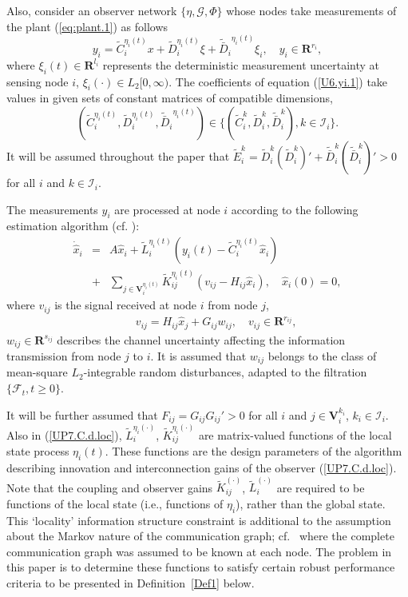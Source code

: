 \documentclass[a4paper,twocolumn]{autart}
\begin{document}
Also, consider an observer network $\{\eta,
\mathcal{G},\Phi\}$ whose nodes take measurements of the plant
(\ref{eq:plant.1}) as follows 
\begin{equation}\label{U6.yi.1}
y_i={\tilde C}_i^{\eta_i(t)}x+{\tilde D}_i^{\eta_i(t)}\xi+{\tilde{\bar
    D}_i}^{\eta_i(t)}\xi_i, \quad y_i\in\mathbf{R}^{r_i},
\end{equation}
where $\xi_i(t)\in \mathbf{R}^{l_i}$ represents the deterministic measurement 
uncertainty at sensing node $i$, $\xi_i(\cdot)\in L_2[0,\infty)$. The 
coefficients of equation (\ref{U6.yi.1}) take values in given sets of
constant matrices of compatible dimensions, 
\[
({\tilde C}_i^{\eta_i(t)},{\tilde  D}_i^{\eta_i(t)},
{\tilde{\bar D}_i}^{\eta_i(t)})\in \{(\tilde C_i^k,\tilde D_i^k,\tilde{\bar
  D}_i^k),k\in\mathcal{I}_i\}. 
\]
It will be assumed throughout the paper that $\tilde E_i^k=\tilde D_i^k(\tilde
D_i^k)'+\tilde{\bar D}_i^k(\tilde{\bar D}_i^k)'>0$ for all $i$ and $k\in\mathcal{I}_i$. 

The measurements $y_i$ are processed at node $i$ according to the following
estimation algorithm (cf. \cite{SS-2009,U6,LaU1}): 
 \begin{eqnarray}
    \dot{\hat x}_i&=&A\hat x_i +
    {\tilde L}_i^{\eta_i(t)}(y_i(t)-{\tilde C}_i^{\eta_i(t)}\hat x_i)\nonumber \\
    &+&\sum_{j\in
      \mathbf{V}_i^{\eta_i(t)}}{\tilde K}_{ij}^{\eta_i(t)}(v_{ij}-H_{ij}\hat
    x_i), \quad \hat x_i(0)=0, 
  \label{UP7.C.d.loc} 
\end{eqnarray}
where $v_{ij}$ is the signal received at node $i$ from node $j$,
\begin{eqnarray}
  \label{vij}
  &&v_{ij}=H_{ij}\hat x_j+G_{ij}w_{ij}, \quad v_{ij}\in \mathbf{R}^{r_{ij}},
\end{eqnarray}
$w_{ij}\in \mathbf{R}^{s_{ij}}$ describes the channel uncertainty affecting the
information 
transmission from node $j$ to $i$. It is assumed that $w_{ij}$ belongs  to 
the class of mean-square $L_2$-integrable random disturbances, adapted to the
filtration $\{\mathcal{F}_t,t\ge 0\}$. 

It will be further assumed that
$F_{ij}=G_{ij}G_{ij}'>0$ for all $i$ and $j\in\mathbf{V}_i^{k_i}$,
$k_i\in\mathcal{I}_i$. Also in (\ref{UP7.C.d.loc}), ${\tilde
  L}_i^{\eta_i(\cdot)}$, ${\tilde K}_{ij}^{\eta_i(\cdot)}$ are
matrix-valued functions of the local state process $\eta_i(t)$. These
functions are the design parameters of the algorithm describing innovation
and interconnection gains of the observer (\ref{UP7.C.d.loc}). Note that 
the coupling and
observer gains ${\tilde 
  K}_{ij}^{(\cdot)}$, ${\tilde L}_i^{(\cdot)}$  are required to be
functions of the local state (i.e., functions of $\eta_i$), rather than the
global state. This `locality' information structure 
constraint is additional to the assumption about the Markov nature of the communication
graph; cf.~\cite{SS-2009} where the complete communication
graph was assumed to be known at each node. The problem in this paper is to determine these functions to
satisfy certain robust performance criteria to be presented in
Definition~\ref{Def1} below. 
\end{document}
